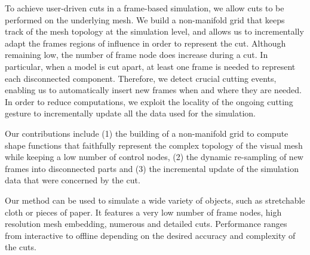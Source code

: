 To achieve user-driven cuts in a frame-based simulation, we allow cuts to be performed on the underlying mesh.
We build a non-manifold grid that keeps track of the mesh topology at the simulation level, and allows us to incrementally adapt the frames regions of influence in order to  represent the cut.
Although remaining low, the number of frame node does increase during a cut. In particular, when a model is cut apart, at least one frame is needed to represent each disconnected component. 
Therefore, we detect crucial cutting events, enabling us to automatically insert new frames when and where they are needed.
In order to reduce computations, we exploit the locality of the ongoing cutting gesture to incrementally update all the data used for the simulation.

Our contributions include (1) the building of a non-manifold grid to compute shape functions that faithfully represent the  complex topology of the visual mesh while keeping a low number of control nodes, (2) the dynamic re-sampling of new frames into disconnected parts and (3) the incremental update of the simulation data that were concerned by the cut.

Our method can be used to simulate a wide variety of objects, such as stretchable cloth or pieces of paper. It features a very low number of frame nodes, high resolution mesh embedding, numerous and detailed cuts. Performance ranges from interactive to offline depending on the desired accuracy and complexity of the cuts.

